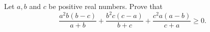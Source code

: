 Let $a,b$ and $c$ be positive real numbers. Prove that \[ \frac{a^2b(b-c)}{a+b}+\frac{b^2c(c-a)}{b+c}+\frac{c^2a(a-b)}{c+a} \ge 0. \]